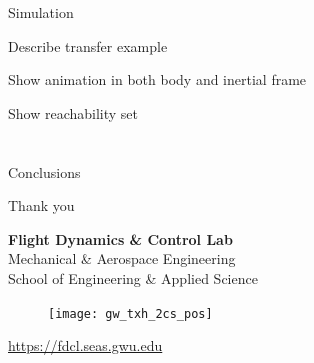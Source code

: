 \documentclass[11pt,professionalfonts]{beamer}
\begin{document}
\begin{frame}{Simulation} %

Describe transfer example

Show animation in both body and inertial frame

Show reachability set


\end{frame}%


\section*{}
\subsection*{}

\begin{frame}{Conclusions} %

  

\end{frame}   %

\begin{frame}[c]{Thank you}
  \centering
  
  \textbf{\large Flight Dynamics \& Control Lab} \\
  Mechanical \& Aerospace Engineering \\
  School of Engineering \& Applied Science
  
  \begin{figure} %
        \texttt{[image: gw\_txh\_2cs\_pos]}
    \end{figure}
  
  \url{https://fdcl.seas.gwu.edu}
\end{frame}
\end{document}
